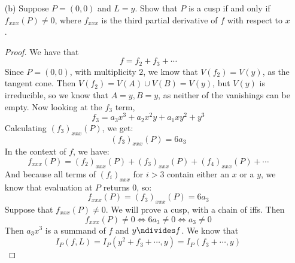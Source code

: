 \documentclass{article}
\begin{document}
\begin{itemize}
        \item [(b)] Suppose $P = (0, 0)$ and $L = y$. Show that $P$ is a cusp if and only if $f_{xxx}(P) \neq 0$, where $f_{xxx}$ is the third partial derivative of $f$ with respect to $x$.
            \begin{proof}
                 We have that
                    \begin{equation*}
                        f = f_{2} + f_{3} + \cdots
                    \end{equation*}
                Since $P = (0, 0)$, with multiplicity $2$, we know that $V(f_{2}) = V(y)$, as the tangent cone. Then $V(f_{2}) = V(A) \cup V(B) = V(y)$, but $V(y)$ is irreducible, so we know that $A = y, B = y$, as neither of the vanishings can be empty. Now looking at the $f_{3}$ term, 
                    \begin{equation*}
                        f_{3} = a_{3}x^{3} + a_{2}x^{2}y + a_{1}xy^{2} + y^{3}
                    \end{equation*}
                Calculating $(f_{3})_{xxx}(P)$, we get:
                    \begin{equation*}
                        (f_{3})_{xxx}(P) = 6a_{3}
                    \end{equation*}
                In the context of $f$, we have:
                    \begin{equation*}
                        f_{xxx}(P) = (f_{2})_{xxx}(P) + (f_{3})_{xxx}(P) + (f_{4})_{xxx}(P) + \cdots
                    \end{equation*}
                And because all terms of $(f_{i})_{xxx}$ for $i >3$ contain either an $x$ or a $y$, we know that evaluation at $P$ returns $0$, so:
                    \begin{equation*}
                        f_{xxx}(P) = (f_{3})_{xxx}(P) = 6a_{3}
                    \end{equation*}
                Suppose that $f_{xxx}(P) \neq 0$. We will prove a cusp, with a chain of iffs. Then
                    \begin{equation*}
                        f_{xxx}(P) \neq 0 \iff 6a_{3} \neq 0 \iff a_{3} \neq 0
                    \end{equation*}
                Then $a_{3}x^{3}$ is a summand of $f$ and $y \ndivides f$. We know that
                    \begin{equation*}
                        I_{P}(f, L) = I_{P}(y^{2} + f_{3} + \cdots, y) = I_{P}(f_{3} + \cdots, y)
                    \end{equation*}

\end{proof}
\end{itemize}
\end{document}
